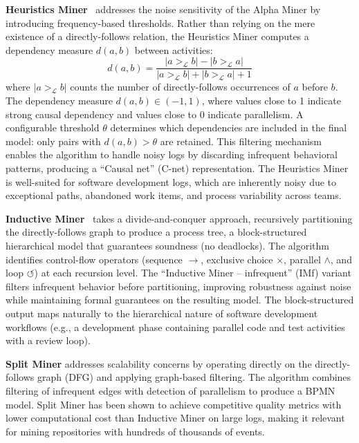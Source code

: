 \textbf{Heuristics Miner}~\cite{weijters2006process} addresses the noise
sensitivity of the Alpha Miner by introducing frequency-based thresholds.
Rather than relying on the mere existence of a directly-follows relation,
the Heuristics Miner computes a dependency measure $d(a, b)$ between
activities:
\begin{equation}
\label{eq:dependency-measure}
d(a, b) = \frac{|a >_\mathcal{L} b| - |b >_\mathcal{L} a|}
           {|a >_\mathcal{L} b| + |b >_\mathcal{L} a| + 1}
\end{equation}
where $|a >_\mathcal{L} b|$ counts the number of directly-follows
occurrences of $a$ before $b$. The dependency measure $d(a,b) \in (-1, 1)$,
where values close to 1 indicate strong causal dependency and values close
to 0 indicate parallelism. A configurable threshold $\theta$ determines
which dependencies are included in the final model: only pairs with
$d(a,b) > \theta$ are retained. This filtering mechanism enables the
algorithm to handle noisy logs by discarding infrequent behavioral
patterns, producing a ``Causal net'' (C-net) representation. The Heuristics
Miner is well-suited for software development logs, which are inherently
noisy due to exceptional paths, abandoned work items, and process
variability across teams.

\textbf{Inductive Miner}~\cite{leemans2013discovering} takes a
divide-and-conquer approach, recursively partitioning the directly-follows
graph to produce a process tree, a block-structured hierarchical model
that guarantees soundness (no deadlocks). The algorithm identifies
control-flow operators (sequence $\rightarrow$, exclusive choice $\times$,
parallel $\wedge$, and loop $\circlearrowleft$) at each recursion level.
The ``Inductive Miner -- infrequent'' (IMf) variant filters infrequent
behavior before partitioning, improving robustness against noise while
maintaining formal guarantees on the resulting model. The block-structured
output maps naturally to the hierarchical nature of software development
workflows (e.g., a development phase containing parallel code and test
activities with a review loop).

\textbf{Split Miner} addresses scalability concerns by operating directly
on the directly-follows graph (DFG) and applying graph-based filtering.
The algorithm combines filtering of infrequent edges with detection of
parallelism to produce a BPMN model. Split Miner has been shown to
achieve competitive quality metrics with lower computational cost than
Inductive Miner on large logs, making it relevant for mining repositories
with hundreds of thousands of events.

